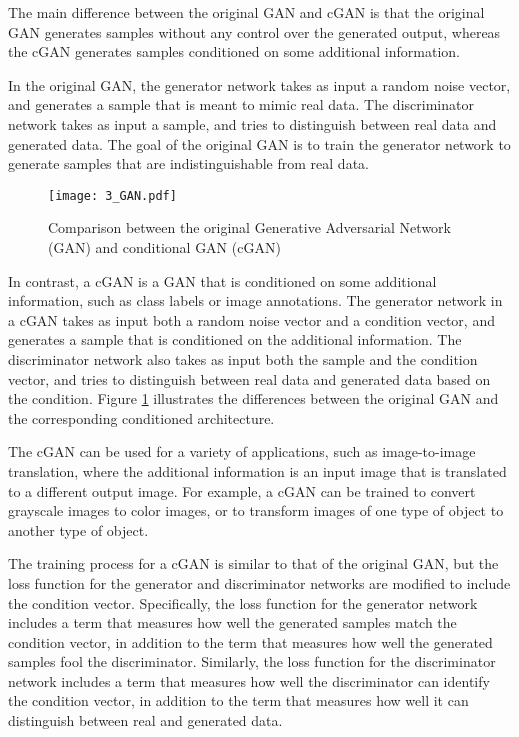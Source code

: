 The main difference between the original GAN and cGAN is that the original GAN generates samples without any control over the generated output, whereas the cGAN generates samples conditioned on some additional information.

In the original GAN, the generator network takes as input a random noise vector, and generates a sample that is meant to mimic real data. The discriminator network takes as input a sample, and tries to distinguish between real data and generated data. The goal of the original GAN is to train the generator network to generate samples that are indistinguishable from real data.

\begin{figure}[h]
	\centering
	\texttt{[image: 3\_GAN.pdf]}
	\caption{Comparison between the original Generative Adversarial Network (GAN) and conditional GAN (cGAN)}
	\label{fig:3_GAN}
\end{figure}

In contrast, a cGAN is a GAN that is conditioned on some additional information, such as class labels or image annotations. The generator network in a cGAN takes as input both a random noise vector and a condition vector, and generates a sample that is conditioned on the additional information. The discriminator network also takes as input both the sample and the condition vector, and tries to distinguish between real data and generated data based on the condition. Figure \ref{fig:3_GAN} illustrates the differences between the original GAN and the corresponding conditioned architecture.

The cGAN can be used for a variety of applications, such as image-to-image translation, where the additional information is an input image that is translated to a different output image. For example, a cGAN can be trained to convert grayscale images to color images, or to transform images of one type of object to another type of object.

The training process for a cGAN is similar to that of the original GAN, but the loss function for the generator and discriminator networks are modified to include the condition vector. Specifically, the loss function for the generator network includes a term that measures how well the generated samples match the condition vector, in addition to the term that measures how well the generated samples fool the discriminator. Similarly, the loss function for the discriminator network includes a term that measures how well the discriminator can identify the condition vector, in addition to the term that measures how well it can distinguish between real and generated data.

